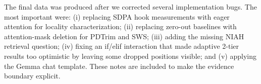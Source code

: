 \documentclass[11pt]{article}
\newcommand{\niah}{NIAH}
\theoremstyle{plain}
\theoremstyle{definition}
\begin{document}
The final data was produced after we corrected several implementation bugs.  The most important were: (i) replacing SDPA hook measurements with eager attention for locality characterization; (ii) replacing zero-out baselines with attention-mask deletion for PDTrim and SWS; (iii) adding the missing \niah{} retrieval question; (iv) fixing an if/elif interaction that made adaptive 2-tier results too optimistic by leaving some dropped positions visible; and (v) applying the Gemma chat template.  These notes are included to make the evidence boundary explicit.



\end{document}
